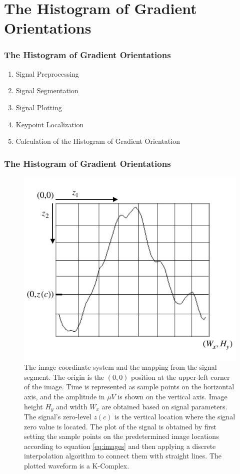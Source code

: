 \documentclass[aspectratio=169]{beamer}
\begin{document}
\section{The Histogram of Gradient Orientations}    
\begin{frame}
\frametitle{The Histogram of Gradient Orientations}
\begin{center}
\begin{enumerate}
 \item<1-> Signal Preprocessing
 \item<2-> Signal Segmentation
 \item<3-> Signal Plotting
 \item<4-> Keypoint Localization
 \item<5-> Calculation of the Histogram of Gradient Orientation
\end{enumerate}
\end{center}
\end{frame}

\begin{frame}
\frametitle{The Histogram of Gradient Orientations}
\begin{center}
\begin{figure}[h!]
\centering
\includegraphics[scale=0.9]{images/imagecoordinatesystem.pdf}
\caption[Image Coordinate System]{The image coordinate system and the mapping from the signal segment.  The origin is the $(0,0)$ position at the upper-left corner of the image.  Time is represented as sample points on the horizontal axis, and the amplitude in $\mu V$ is shown on the vertical axis. Image height $H_y$ and width $W_x$ are obtained based on signal parameters.  The signal's zero-level $z(c)$ is the vertical location where the signal zero value is located. The plot of the signal is obtained by first setting the sample points on the predetermined image locations according to equation \ref{eq:images} and then applying a discrete interpolation algorithm to connect them with straight lines. The plotted waveform is a K-Complex.}
\label{fig:imagecoordinatesystem}
\end{figure}
\end{center}
\end{frame}
\end{document}
